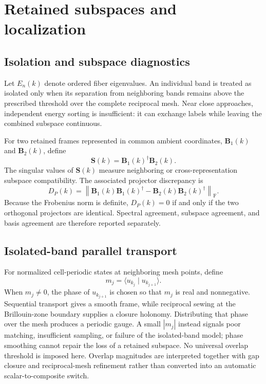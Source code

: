 \section{Retained subspaces and localization}

\subsection{Isolation and subspace diagnostics}

Let $E_n(k)$ denote ordered fiber eigenvalues. An individual band is treated as
isolated only when its separation from neighboring bands remains above the
prescribed threshold over the complete reciprocal mesh. Near close approaches,
independent energy sorting is insufficient: it can exchange labels while
leaving the combined subspace continuous.

For two retained frames represented in common ambient coordinates,
$\mathbf B_1(k)$ and $\mathbf B_2(k)$, define
\begin{equation}
    \mathbf S(k)=\mathbf B_1(k)^\dagger\mathbf B_2(k).
\end{equation}
The singular values of $\mathbf S(k)$ measure neighboring or cross-representation
subspace compatibility. The associated projector discrepancy is
\begin{equation}
    D_P(k)
    =
    \left\lVert
        \mathbf B_1(k)\mathbf B_1(k)^\dagger
        -\mathbf B_2(k)\mathbf B_2(k)^\dagger
    \right\rVert_{\mathrm F}.
\end{equation}
Because the Frobenius norm is definite, $D_P(k)=0$ if and only if the two
orthogonal projectors are identical. Spectral agreement, subspace agreement,
and basis agreement are therefore reported separately.

\subsection{Isolated-band parallel transport}

For normalized cell-periodic states at neighboring mesh points, define
\begin{equation}
    m_j=\langle u_{k_j}\mid u_{k_{j+1}}\rangle.
\end{equation}
When $m_j\neq0$, the phase of $u_{k_{j+1}}$ is chosen so that $m_j$ is real and
nonnegative. Sequential transport gives a smooth frame, while reciprocal sewing
at the Brillouin-zone boundary supplies a closure holonomy. Distributing that
phase over the mesh produces a periodic gauge. A small $|m_j|$ instead signals poor matching, insufficient sampling, or
failure of the isolated-band model; phase smoothing cannot repair the loss of
a retained subspace. No universal overlap threshold is imposed here. Overlap
magnitudes are interpreted together with gap closure and reciprocal-mesh
refinement rather than converted into an automatic scalar-to-composite switch.

